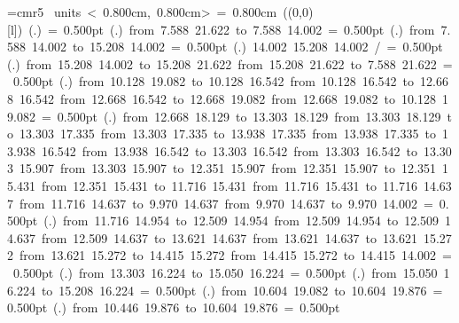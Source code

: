 \font\thinlinefont=cmr5
\mbox{\beginpicture
\setcoordinatesystem units < 0.800cm, 0.800cm>
\unitlength= 0.800cm
\linethickness=1pt
\setplotsymbol ({\makebox(0,0)[l]{\tencirc{}}})
\setshadesymbol ({\thinlinefont .})
\setlinear
%
%
\linethickness= 0.500pt
\setplotsymbol ({\thinlinefont .})
\putrule from  7.588 21.622 to  7.588 14.002
%
%
\linethickness= 0.500pt
\setplotsymbol ({\thinlinefont .})
\putrule from  7.588 14.002 to 15.208 14.002
%
%
\linethickness= 0.500pt
\setplotsymbol ({\thinlinefont .})
 14.002 15.208 14.002 /
%
%
\linethickness= 0.500pt
\setplotsymbol ({\thinlinefont .})
\putrule from 15.208 14.002 to 15.208 21.622
\putrule from 15.208 21.622 to  7.588 21.622
%
%
\linethickness= 0.500pt
\setplotsymbol ({\thinlinefont .})
\putrule from 10.128 19.082 to 10.128 16.542
\putrule from 10.128 16.542 to 12.668 16.542
\putrule from 12.668 16.542 to 12.668 19.082
\putrule from 12.668 19.082 to 10.128 19.082
%
%
\linethickness= 0.500pt
\setplotsymbol ({\thinlinefont .})
\putrule from 12.668 18.129 to 13.303 18.129
\putrule from 13.303 18.129 to 13.303 17.335
\putrule from 13.303 17.335 to 13.938 17.335
\putrule from 13.938 17.335 to 13.938 16.542
\putrule from 13.938 16.542 to 13.303 16.542
\putrule from 13.303 16.542 to 13.303 15.907
\putrule from 13.303 15.907 to 12.351 15.907
\putrule from 12.351 15.907 to 12.351 15.431
\putrule from 12.351 15.431 to 11.716 15.431
\putrule from 11.716 15.431 to 11.716 14.637
\putrule from 11.716 14.637 to  9.970 14.637
\putrule from  9.970 14.637 to  9.970 14.002
%
%
\linethickness= 0.500pt
\setplotsymbol ({\thinlinefont .})
\putrule from 11.716 14.954 to 12.509 14.954
\putrule from 12.509 14.954 to 12.509 14.637
\putrule from 12.509 14.637 to 13.621 14.637
\putrule from 13.621 14.637 to 13.621 15.272
\putrule from 13.621 15.272 to 14.415 15.272
\putrule from 14.415 15.272 to 14.415 14.002
%
%
\linethickness= 0.500pt
\setplotsymbol ({\thinlinefont .})
\putrule from 13.303 16.224 to 15.050 16.224
%
%
\linethickness= 0.500pt
\setplotsymbol ({\thinlinefont .})
\putrule from 15.050 16.224 to 15.208 16.224
%
%
\linethickness= 0.500pt
\setplotsymbol ({\thinlinefont .})
\putrule from 10.604 19.082 to 10.604 19.876
%
%
\linethickness= 0.500pt
\setplotsymbol ({\thinlinefont .})
\putrule from 10.446 19.876 to 10.604 19.876
%
%
\linethickness= 0.500pt
}
